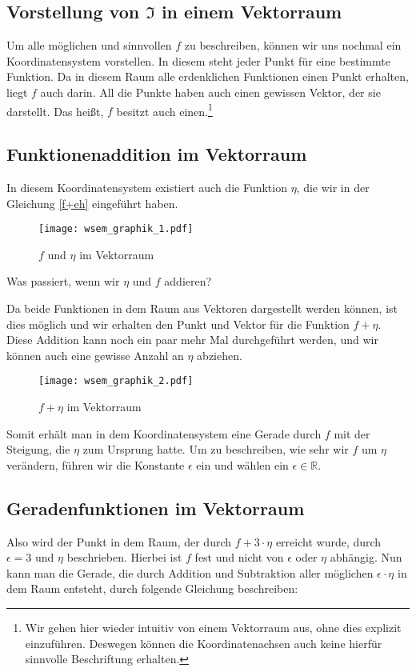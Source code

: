 \subsection{Vorstellung von $\mathfrak{I}$ in einem Vektorraum}

Um alle möglichen und sinnvollen $f$ zu beschreiben, können wir uns nochmal ein Koordinatensystem vorstellen. 
In diesem steht jeder Punkt für eine bestimmte Funktion. 
Da in diesem Raum alle erdenklichen Funktionen einen Punkt erhalten, liegt $f$ auch darin. 
All die Punkte haben auch einen gewissen Vektor, der sie darstellt. 
Das heißt, $f$ besitzt auch einen.\footnote{ Wir gehen hier wieder intuitiv von einem Vektorraum aus, ohne dies explizit einzuführen. Deswegen können die Koordinatenachsen auch keine hierfür sinnvolle Beschriftung erhalten.}

\subsection{Funktionenaddition im Vektorraum}
In diesem Koordinatensystem existiert auch die Funktion $\eta$, die wir in der Gleichung \ref{f+eh} eingeführt haben.

\begin{figure}[ht]
 \centering
 \texttt{[image: wsem\_graphik\_1.pdf]} 
 \caption[Funktionen im Vektorraum. TikZ - eigene Arbeit.]{$f$ und $\eta$ im Vektorraum}
 \label{fig:f&eta} 
\end{figure} 

Was passiert, wenn wir $\eta$ und $f$ addieren?

Da beide Funktionen in dem Raum aus Vektoren dargestellt werden können, ist dies möglich und wir erhalten den Punkt und Vektor für die Funktion $f+\eta$. Diese Addition kann noch ein paar mehr Mal durchgeführt werden, und wir können auch eine gewisse Anzahl an $\eta$ abziehen.


\begin{figure}[ht]
 \centering
 \texttt{[image: wsem\_graphik\_2.pdf]} 
 \caption[Addition im Vektorraum. TikZ - eigene Arbeit.]{$f+ \eta$ im Vektorraum}
 \label{fig:f&eta2} 
\end{figure} 


Somit erhält man in dem Koordinatensystem eine Gerade durch $f$ mit der Steigung, die $\eta$ zum Ursprung hatte. Um zu beschreiben, wie sehr wir $f$ um $\eta$ verändern, führen wir die Konstante $\epsilon$ ein und wählen ein $\epsilon \in \mathbb{R}$.

\subsection{Geradenfunktionen im Vektorraum}
Also wird der Punkt in dem Raum, der durch $f+3\cdot \eta$ erreicht wurde, durch $\epsilon=3$ und $\eta$ beschrieben. Hierbei ist $f$ fest und nicht von $\epsilon$ oder $\eta$ abhängig. Nun kann man die Gerade, die durch Addition und Subtraktion aller möglichen $\epsilon\cdot \eta$ in dem Raum entsteht, durch folgende Gleichung beschreiben:

